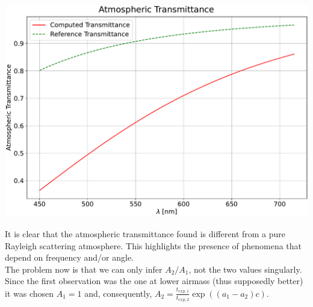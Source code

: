 \documentclass[a4paper]{article}
\newenvironment{Figure}
	{\par\medskip\noindent\minipage{\linewidth}}
	{\endminipage\par\medskip}
\begin{document}
\begin{multicols}{2}
\begin{Figure}
				\centering
				\includegraphics[width=\linewidth]{Atm_trans.pdf}
				\label{fig:atm_tr}
			\end{Figure}
			It is clear that the atmospheric transmittance found is different from a pure Rayleigh scattering atmosphere. This highlights the presence of phenomena that depend on frequency and/or angle.\\
			
			The problem now is that we can only infer $A_2/A_1$, not the two values singularly.\\
			Since the first observation was the one at lower airmass (thus supposedly better) it was chosen $A_1 = 1$ and, consequently, $A_2 = \frac{t_{exp,1}}{t_{exp,2}} \exp((a_1 - a_2)c)$.\\
		

\end{multicols}
\end{document}
